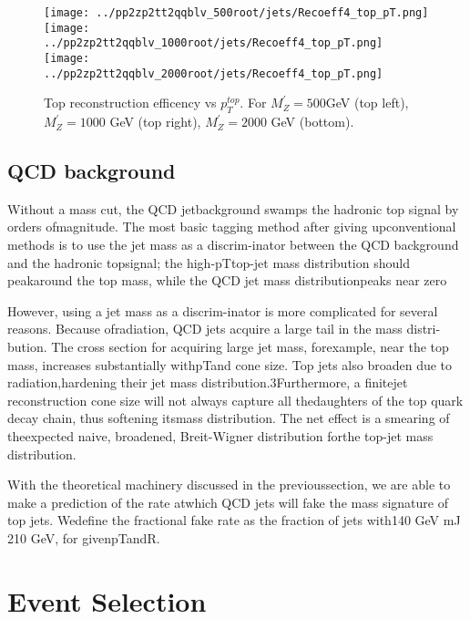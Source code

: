 \documentclass[12pt,a4paper]{article}		%
\begin{document}
\begin{figure}[h]
	\begin{centering}	
		\texttt{[image: ../pp2zp2tt2qqblv\_500root/jets/Recoeff4\_top\_pT.png]} 
		\texttt{[image: ../pp2zp2tt2qqblv\_1000root/jets/Recoeff4\_top\_pT.png]} 
		\texttt{[image: ../pp2zp2tt2qqblv\_2000root/jets/Recoeff4\_top\_pT.png]}
		\caption{Top reconstruction efficency vs $p_T^{top}$. For $M_Z^\prime = 500$GeV (top left), $M_Z^\prime = 1000$ GeV (top right), $M_Z^\prime = 2000$ GeV (bottom).  }
		\label{recoeff_vs_pt}
		\centering
	\end{centering} 		
\end{figure}   

\newpage
\subsection{QCD background}

 	

 Without a mass cut, the QCD jetbackground swamps the hadronic top signal by orders ofmagnitude. The most basic tagging method after giving upconventional methods is to use the jet mass as a discrim-inator between the QCD background and the hadronic topsignal; the high-pTtop-jet mass distribution should peakaround the top mass, while the QCD jet mass distributionpeaks near zero

 However, using a jet mass as a discrim-inator is more complicated for several reasons. Because ofradiation, QCD jets acquire a large tail in the mass distri-bution. The cross section for acquiring large jet mass, forexample, near the top mass, increases substantially withpTand cone size. Top jets also broaden due to radiation,hardening their jet mass distribution.3Furthermore, a finitejet reconstruction cone size will not always capture all thedaughters of the top quark decay chain, thus softening itsmass distribution. The net effect is a smearing of theexpected naive, broadened, Breit-Wigner distribution forthe top-jet mass distribution.
 
 With the theoretical machinery discussed in the previoussection, we are able to make a prediction of the rate atwhich QCD jets will fake the mass signature of top jets. Wedefine the fractional fake rate as the fraction of jets with140 GeV mJ 210 GeV, for givenpTandR. 

\newpage

\section{Event Selection}
\newpage
\end{document}
